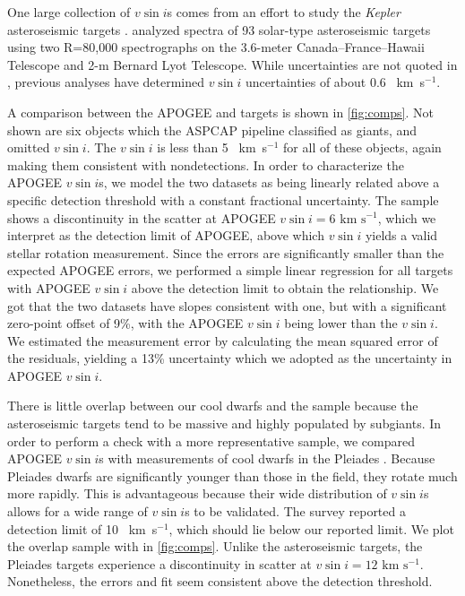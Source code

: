 \documentclass[manuscript]{aastex6}
\newcommand{\vsini}{\ensuremath{v \sin i}}
\newcommand{\Kepler}{\mbox{\textit{Kepler}}}
\newcommand{\kms}{\textrm{~km~s}\ensuremath{^{-1}}}
\begin{document}
One large collection of \vsini{}s comes from an effort to study the
\Kepler{} asteroseismic targets \citep{Bruntt12}. \citet{Bruntt12} analyzed 
spectra of 93 solar-type asteroseismic targets using two R=80,000 spectrographs 
on the 3.6-meter Canada--France--Hawaii Telescope and 2-m Bernard Lyot
Telescope. While uncertainties are not quoted in \citet{Bruntt12},
previous analyses have determined \vsini{} uncertainties of about 0.6
\kms \citep{Bruntt10a,Bruntt10b}.

A comparison between the APOGEE and \citet{Bruntt12} targets is shown in
\cref{fig:comps}. Not shown are six
objects which the ASPCAP pipeline classified as giants, and omitted
\vsini{}. The \citet{Bruntt12} \vsini{} is less than 5
\kms{} for all of these objects, again making them consistent with 
nondetections.  In order to characterize the APOGEE \vsini{}s, we model the 
two datasets as being linearly related above a specific detection threshold 
with a constant fractional uncertainty. The sample shows a 
discontinuity in the scatter at APOGEE \(\vsini=6\kms\), which we 
interpret as the detection limit of APOGEE, above which \vsini{} yields a 
valid stellar rotation measurement. Since the \citet{Bruntt12} errors are
significantly smaller than the expected APOGEE errors, we performed a simple 
linear regression for all targets with APOGEE \vsini{} above the detection 
limit to obtain the relationship. We got that the two datasets have slopes
consistent with one, but with a significant zero-point offset of 9\%,
with the APOGEE \vsini{} being lower than the \citet{Bruntt12}
\vsini{}. We estimated the measurement error by calculating the mean squared 
error of the residuals, yielding a 13\% uncertainty which we adopted as the 
uncertainty in APOGEE \vsini{}.

There is little overlap between our cool dwarfs and the 
\citet{Bruntt12} sample because the asteroseismic targets tend to be massive and 
highly populated by subgiants. In order to perform a check with a more
representative sample, we compared APOGEE \vsini{}s with  
measurements of cool dwarfs in the Pleiades \citep{Stauffer87}. Because
Pleiades dwarfs are significantly younger than those in the field,
they rotate much more rapidly. This is advantageous because their 
wide distribution of \vsini{}s allows for a wide range of \vsini{}s to be 
validated. The \citet{Stauffer87} survey reported a detection limit of
10 \kms, which should lie below our reported limit. We plot the overlap 
sample with \citet{Stauffer87} in \cref{fig:comps}.  Unlike the asteroseismic 
targets, the Pleiades targets experience a discontinuity in scatter at 
\(\vsini = 12 \kms\).  Nonetheless, the errors and fit seem consistent above 
the detection threshold.
\end{document}
